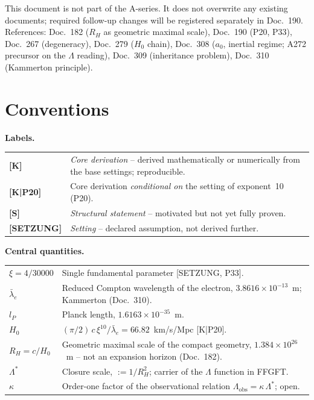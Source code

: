 \documentclass[11pt]{report}
\begin{document}
This document is not part of the A-series. It does not overwrite any
existing documents; required follow-up changes will be registered
separately in Doc.~190.
References: Doc.~182 ($R_H$ as geometric maximal scale),
Doc.~190 (P20, P33), Doc.~267 (degeneracy), Doc.~279 ($H_0$ chain),
Doc.~308 ($a_0$, inertial regime; A272 precursor on the $\Lambda$
reading), Doc.~309 (inheritance problem), Doc.~310 (Kammerton
principle).

\section*{Conventions}

\noindent\textbf{Labels.}

\medskip
\begin{tabular}{@{}lp{11cm}}
\textbf{[K]}       & \emph{Core derivation} -- derived mathematically
                     or numerically from the base settings; reproducible. \\[4pt]
\textbf{[K|P20]} & Core derivation \emph{conditional on} the
                     setting of exponent~10 (P20). \\[4pt]
\textbf{[S]}       & \emph{Structural statement} -- motivated but not
                     yet fully proven. \\[4pt]
\textbf{[SETZUNG]} & \emph{Setting} -- declared assumption, not
                     derived further. \\
\end{tabular}

\medskip
\noindent\textbf{Central quantities.}

\medskip
\begin{tabular}{@{}lp{10.5cm}}
$\xi = 4/30000$ & Single fundamental parameter [SETZUNG, P33]. \\[4pt]
$\bar\lambda_e$ & Reduced Compton wavelength of the electron,
                  $3.8616\times10^{-13}$~m; Kammerton (Doc.~310). \\[4pt]
$l_P$           & Planck length, $1.6163\times10^{-35}$~m. \\[4pt]
$H_0$           & $(\pi/2)\,c\,\xi^{10}/\bar\lambda_e
                   = 66.82$~km/s/Mpc [K|P20]. \\[4pt]
$R_H = c/H_0$   & Geometric maximal scale of the compact geometry,
                  $1.384\times10^{26}$~m -- not an expansion horizon
                  (Doc.~182). \\[4pt]
$\Lambda^{*}$   & Closure scale, $:= 1/R_H^2$; carrier of the
                  $\Lambda$ function in FFGFT. \\[4pt]
$\kappa$        & Order-one factor of the observational relation
                  $\Lambda_\text{obs} = \kappa\,\Lambda^{*}$; open. \\
\end{tabular}
\end{document}
